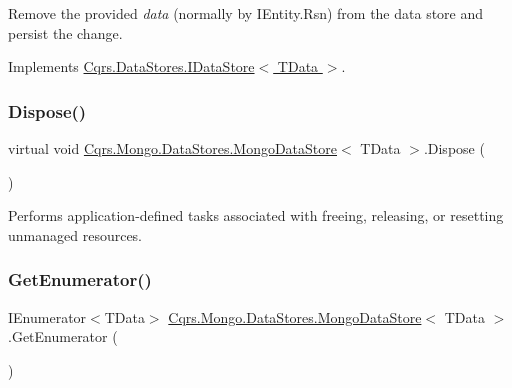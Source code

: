 Remove the provided {\itshape data}  (normally by I\+Entity.\+Rsn) from the data store and persist the change. 



Implements \hyperlink{interfaceCqrs_1_1DataStores_1_1IDataStore_aa7ade96f2f3151d5353cf7bdbb2baec5}{Cqrs.\+Data\+Stores.\+I\+Data\+Store$<$ T\+Data $>$}.

\mbox{\label{classCqrs_1_1Mongo_1_1DataStores_1_1MongoDataStore_a4af729196a5fa4962961c9ce38b74891}} 
\subsubsection{\texorpdfstring{Dispose()}{Dispose()}}
{\footnotesize\ttfamily virtual void \hyperlink{classCqrs_1_1Mongo_1_1DataStores_1_1MongoDataStore}{Cqrs.\+Mongo.\+Data\+Stores.\+Mongo\+Data\+Store}$<$ T\+Data $>$.Dispose (\begin{DoxyParamCaption}{ }\end{DoxyParamCaption})\hspace{0.3cm}{\ttfamily [virtual]}}



Performs application-\/defined tasks associated with freeing, releasing, or resetting unmanaged resources. 

\mbox{\label{classCqrs_1_1Mongo_1_1DataStores_1_1MongoDataStore_a3eeaf3e59a540025ff2aa0f62b5dd465}} 
\subsubsection{\texorpdfstring{Get\+Enumerator()}{GetEnumerator()}}
{\footnotesize\ttfamily I\+Enumerator$<$T\+Data$>$ \hyperlink{classCqrs_1_1Mongo_1_1DataStores_1_1MongoDataStore}{Cqrs.\+Mongo.\+Data\+Stores.\+Mongo\+Data\+Store}$<$ T\+Data $>$.Get\+Enumerator (\begin{DoxyParamCaption}{ }\end{DoxyParamCaption})}



